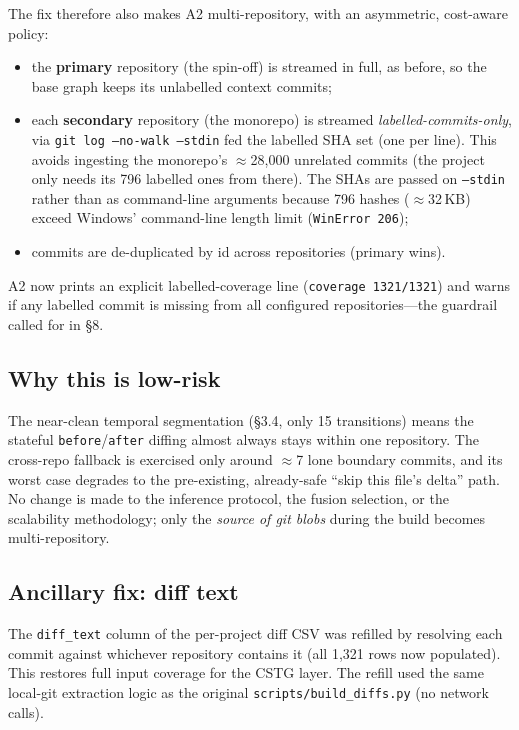\documentclass[11pt]{article}
\newcommand{\code}[1]{\texttt{#1}}
\begin{document}
The fix therefore also makes A2 multi-repository, with an asymmetric,
cost-aware policy:
\begin{itemize}
  \item the \textbf{primary} repository (the spin-off) is streamed in full, as
  before, so the base graph keeps its unlabelled context commits;
  \item each \textbf{secondary} repository (the monorepo) is streamed
  \emph{labelled-commits-only}, via \code{git log --no-walk --stdin} fed the
  labelled SHA set (one per line). This avoids ingesting the monorepo's
  $\approx$28{,}000 unrelated commits (the project only needs its 796 labelled
  ones from there). The SHAs are passed on \code{--stdin} rather than as
  command-line arguments because 796 hashes ($\approx$32\,KB) exceed Windows'
  command-line length limit (\code{WinError 206});
  \item commits are de-duplicated by id across repositories (primary wins).
\end{itemize}
A2 now prints an explicit labelled-coverage line
(\code{coverage 1321/1321}) and warns if any labelled commit is missing from all
configured repositories---the guardrail called for in \S8.

\subsection{Why this is low-risk}
The near-clean temporal segmentation (\S3.4, only 15 transitions) means the
stateful \code{before}/\code{after} diffing almost always stays within one
repository. The cross-repo fallback is exercised only around $\approx$7 lone
boundary commits, and its worst case degrades to the pre-existing, already-safe
``skip this file's delta'' path. No change is made to the inference protocol, the
fusion selection, or the scalability methodology; only the \emph{source of git
blobs} during the build becomes multi-repository.

\subsection{Ancillary fix: diff text}
The \code{diff\_text} column of the per-project diff CSV was refilled by resolving
each commit against whichever repository contains it (all 1{,}321 rows now
populated). This restores full input coverage for the CSTG layer. The refill used
the same local-git extraction logic as the original
\code{scripts/build\_diffs.py} (no network calls).
\end{document}
